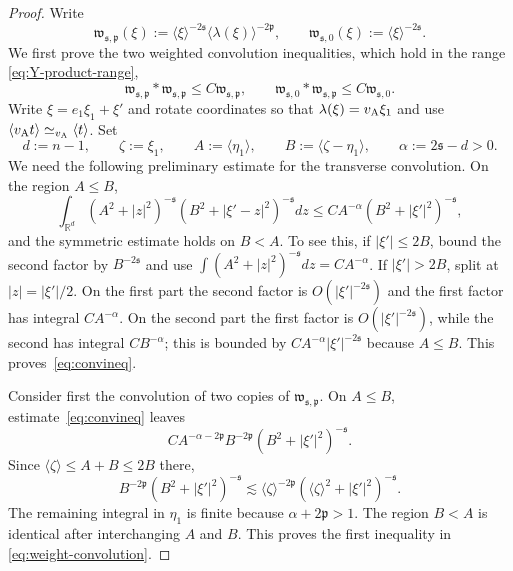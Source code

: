 \documentclass[11pt,reqno]{amsart}
\theoremstyle{plain}
\theoremstyle{definition}
\theoremstyle{remark}
\numberwithin{equation}{section}
\newcommand{\sreg}{\mathfrak s}
\newcommand{\preg}{\mathfrak p}
\newcommand{\Real}{\mathbb R}
\begin{document}
\begin{proof}
Write
\[
 \mathfrak w_{\sreg,\preg}(\xi):=\langle\xi\rangle^{-2\sreg}\langle\lambda(\xi)\rangle^{-2\preg},
 \qquad \mathfrak w_{\sreg,0}(\xi):=\langle\xi\rangle^{-2\sreg}.
\]
We first prove the two weighted convolution inequalities, which hold in the range \eqref{eq:Y-product-range},
\begin{equation}\label{eq:weight-convolution}
 \mathfrak w_{\sreg,\preg}*\mathfrak w_{\sreg,\preg}\le C\mathfrak w_{\sreg,\preg},
 \qquad \mathfrak w_{\sreg,0}*\mathfrak w_{\sreg,\preg}\le C\mathfrak w_{\sreg,0}.
\end{equation}
Write $\xi=e_1\xi_1+\xi'$ and rotate coordinates so that $\lambda(\xi)=v_{\rm A}\xi_1$ and use
$\langle v_{\rm A}t\rangle\simeq_{v_{\rm A}}\langle t\rangle$.  Set
\[
 d:=n-1,\qquad \zeta:=\xi_1,\qquad
 A:=\langle\eta_1\rangle,\qquad
 B:=\langle\zeta-\eta_1\rangle,
 \qquad \alpha:=2\sreg-d>0.
\]
We need the following preliminary estimate for the transverse convolution. On the region $A\le B$,
\begin{equation*}\label{eq:convineq}
    \int_{\Real^{d}}(A^2+|z|^2)^{-\sreg}
 (B^2+|\xi'-z|^2)^{-\sreg} dz
 \le C A^{-\alpha}(B^2+|\xi'|^2)^{-\sreg},
\tag{*}
\end{equation*}
and the symmetric estimate holds on $B<A$.  To see this, if
$|\xi'|\le2B$, bound the second factor by $B^{-2\sreg}$ and use
$\int(A^2+|z|^2)^{-\sreg}dz=C A^{-\alpha}$.  If
$|\xi'|>2B$, split at $|z|=|\xi'|/2$.  On the first part the second
factor is $O(|\xi'|^{-2\sreg})$ and the first factor has integral
$CA^{-\alpha}$.  On the second part the first factor is
$O(|\xi'|^{-2\sreg})$, while the second has integral $CB^{-\alpha}$;
this is bounded by $CA^{-\alpha}|\xi'|^{-2\sreg}$ because $A\le B$.
This proves~\eqref{eq:convineq}.

Consider first the convolution of two copies of
$\mathfrak w_{\sreg,\preg}$.  On $A\le B$, estimate~\eqref{eq:convineq} leaves
\[
 C A^{-\alpha-2\preg}B^{-2\preg}
   (B^2+|\xi'|^2)^{-\sreg}.
\]
Since $\langle\zeta\rangle\le A+B\le2B$ there,
\[
 B^{-2\preg}(B^2+|\xi'|^2)^{-\sreg}
 \lesssim
 \langle\zeta\rangle^{-2\preg}
 (\langle\zeta\rangle^2+|\xi'|^2)^{-\sreg}.
\]
The remaining integral in $\eta_1$ is finite because
$\alpha+2\preg>1$.  The region $B<A$ is identical after interchanging
$A$ and $B$.  This proves the first inequality in
\eqref{eq:weight-convolution}.


\end{proof}
\end{document}
